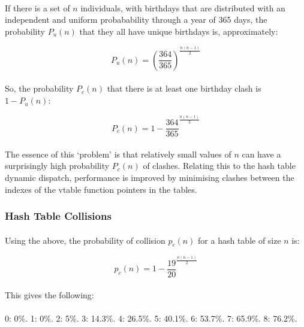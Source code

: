 \documentclass[12pt,twoside,notitlepage]{report}
\begin{document}
\paragraph{}
If there is a set of $n$ individuals, with birthdays that are distributed with an independent and uniform probabability through a year of 365 days, the probability $P_{u}(n)$ that they all have unique birthdays is, approximately:

$$P_{u}(n) = (\frac{364}{365})^{\frac{n(n - 1)}{2}}$$

\paragraph{}
So, the probability $P_{c}(n)$ that there is at least one birthday clash is $1 - P_{u}(n)$:

$$P_{c}(n) = 1 - \frac{364}{365}^{\frac{n(n - 1)}{2}}$$

\paragraph{}
The essence of this `problem' is that relatively small values of $n$ can have a surprisingly high probability $P_{c}(n)$ of clashes. Relating this to the hash table dynamic dispatch, performance is improved by minimising clashes between the indexes of the vtable function pointers in the tables.

\subsubsection{Hash Table Collisions}

\paragraph{}
Using the above, the probability of collision $p_{c}(n)$ for a hash table of size $n$ is:

$$p_{c}(n) = 1 − \frac{19}{20}^\frac{n(n − 1)}{2}$$

\paragraph{}
This gives the following:

\paragraph{}
0: 0\%.
1: 0\%.
2: 5\%.
3: 14.3\%.
4: 26.5\%.
5: 40.1\%.
6: 53.7\%.
7: 65.9\%.
8: 76.2\%.
\end{document}
